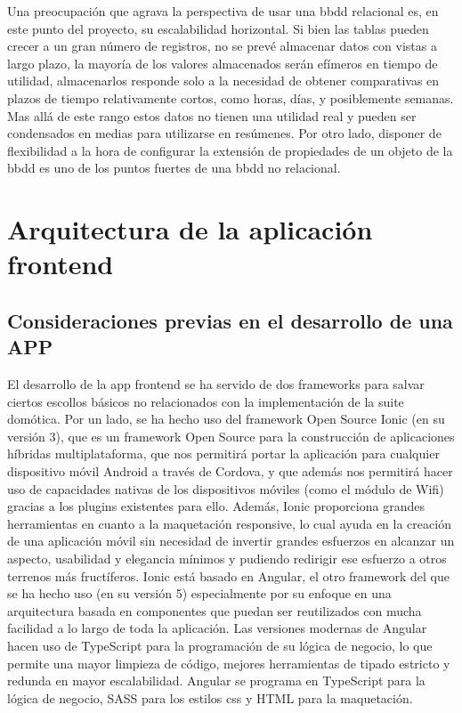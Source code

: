 \vspace{1cm}

Una preocupación que agrava la perspectiva de usar una \gls{bbdd} relacional es, en este punto del proyecto, su escalabilidad horizontal. Si bien las tablas pueden crecer a un gran número de registros, no se prevé almacenar datos con vistas a largo plazo, la mayoría de los valores almacenados serán efímeros en tiempo de utilidad, almacenarlos responde solo a la necesidad de obtener comparativas en plazos de tiempo relativamente cortos, como horas, días, y posiblemente semanas. Mas allá de este rango estos datos no tienen una utilidad real y pueden ser condensados en medias para utilizarse en resúmenes. Por otro lado, disponer de flexibilidad a la hora de configurar la extensión de propiedades de un objeto de la \gls{bbdd} es uno de los puntos fuertes de una \gls{bbdd} no relacional.


\section{Arquitectura de la aplicación frontend}
\label{ch:Capitulo4.7}

\subsection{Consideraciones previas en el desarrollo de una APP}
\label{c:Capitulo4.7.1}

El desarrollo de la app frontend se ha servido de dos frameworks para salvar ciertos escollos básicos no relacionados con la implementación de la suite domótica. Por un lado, se ha hecho uso del framework Open Source Ionic (en su versión 3), que es un framework Open Source para la construcción de aplicaciones híbridas multiplataforma, que nos permitirá portar la aplicación para cualquier dispositivo móvil Android a través de Cordova, y que además nos permitirá hacer uso de capacidades nativas de los dispositivos móviles (como el módulo de Wifi) gracias a los plugins existentes para ello. Además, Ionic proporciona grandes herramientas en cuanto a la maquetación responsive, lo cual ayuda en la creación de una aplicación móvil sin necesidad de invertir grandes esfuerzos en alcanzar un aspecto, usabilidad y elegancia mínimos y pudiendo redirigir ese esfuerzo a otros terrenos más fructíferos. Ionic está basado en Angular, el otro framework del que se ha hecho uso (en su versión 5) especialmente por su enfoque en una arquitectura basada en componentes que puedan ser reutilizados con mucha facilidad a lo largo de toda la aplicación. Las versiones modernas de Angular hacen uso de TypeScript para la programación de su lógica de negocio, lo que permite una mayor limpieza de código, mejores herramientas de tipado estricto y redunda en mayor escalabilidad. Angular se programa en TypeScript para la lógica de negocio, SASS para los estilos css y HTML para la maquetación.


